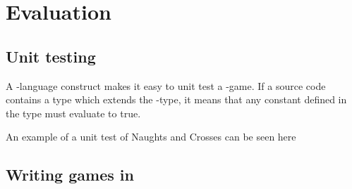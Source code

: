 \chapter{Evaluation}
\label{chap:evaluation}

\section{Unit testing}
A \productname{}-language construct makes it easy to unit test a \productname{}-game.
If a source code contains a type which extends the -type, it means that any constant defined in the type must evaluate to true.

An example of a unit test of Naughts and Crosses can be seen here

\section{Writing games in \productname}

